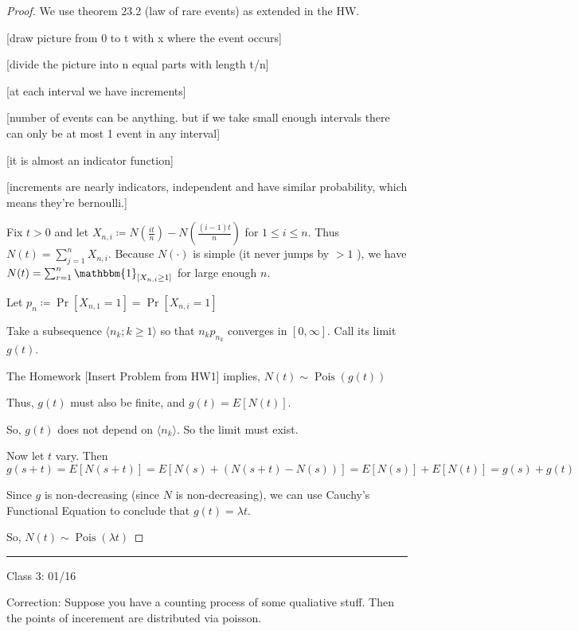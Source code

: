 \documentclass{article}
\theoremstyle{definition}
\newcommand{\Pois}{\operatorname{Pois}}
\begin{document}
\begin{proof}
    We use theorem 23.2 (law of rare events) as extended in the HW.

    [draw picture from 0 to t with x where the event occurs]

    [divide the picture into n equal parts with length t/n]

    [at each interval we have increments]

    [number of events can be anything. but if we take small enough intervals there can only be at most 1 event in any interval]

    [it is almost an indicator function]

    [increments are nearly indicators, independent and have similar probability, which means they're bernoulli.]

    Fix \(t > 0\) and let \(X_{n,i}\coloneqq N(\frac{it}{n})-N(\frac{(i-1)t}{n})\) for \(1\leq i\leq n\). Thus \(N(t)=\sum_{j=1}^{n} X_{n,i}\). Because \(N(\cdot)\) is simple (it never jumps by \(>1\) ), we have \(N(t)=\sum_{r=1}^{n} \mathbbm{1}_{[X_{n,i}\geq 1]} \) for large enough \(n\).
    
    Let \(p_n\coloneqq \Pr[X_{n,1}=1]=\Pr[X_{n,i}=1]\) 

    Take a subsequence \(\langle n_k;k\geq 1 \rangle \) so that \(n_k p_{n_k}\) converges in \([0,\infty ]\). Call its limit \(g(t)\).

    The Homework [Insert Problem from HW1] implies, \(N(t)\sim \Pois(g(t))\) 

    Thus, \(g(t)\) must also be finite, and \(g(t)=E[N(t)]\).

    So, \(g(t)\) does not depend on \(\langle n_k \rangle \). So the limit must exist.
    
    Now let \(t\) vary. Then \(g(s+t)=E[N(s+t)]=E[N(s)+(N(s+t)-N(s))]=E[N(s)]+E[N(t)]=g(s)+g(t)\)
    
    Since \(g\) is non-decreasing (since \(N\) is non-decreasing), we can use Cauchy's Functional Equation to conclude that \(g(t)=\lambda t\).
    
    So, \(N(t)\sim \Pois(\lambda t)\) 

\end{proof}

\hrule
\hfil

Class 3: 01/16

Correction: Suppose you have a counting process of some qualiative stuff. Then the points of incerement are distributed via poisson.
\end{document}
